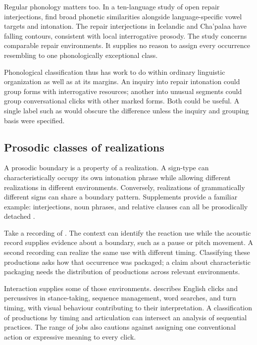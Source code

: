 \documentclass[12pt]{article}
\begin{document}
Regular phonology matters too. In a ten-language study of open repair
interjections, \textcite{dingemanse2013huh} find broad phonetic similarities
alongside language-specific vowel targets and intonation. The repair interjections in Icelandic and
Cha'palaa have falling contours, consistent with local interrogative
prosody. The study concerns comparable repair environments. It supplies
no reason to assign every occurrence resembling  to one
phonologically exceptional class.

Phonological classification thus has work to do within ordinary linguistic
organization as well as at its margins. An inquiry into repair intonation
could group forms with interrogative resources; another into unusual
segments could group conversational clicks with other marked forms.
Both could be useful. A single label such as  would obscure
the difference unless the inquiry and grouping basis were specified.

\subsection{Prosodic classes of realizations}

A prosodic boundary is a property of a realization. A sign-type can
characteristically occupy its own intonation phrase while allowing different
realizations in different environments. Conversely, realizations of
grammatically different signs can share a boundary pattern. Supplements
provide a familiar example: interjections, noun phrases, and relative
clauses can all be prosodically detached
\citep[66, 1350]{HuddlestonPullum2002}.

Take a recording of . The
context can identify the reaction use while the acoustic record supplies
evidence about a boundary, such as a pause or pitch movement. A
second recording can realize the same use with different timing.
Classifying these productions asks how that occurrence was packaged;
a claim about characteristic packaging needs the distribution of
productions across relevant environments.

Interaction supplies some of those environments. \textcite{ogden2013clicks} describes English
clicks and percussives in stance-taking, sequence management, word searches,
and turn timing, with visual behaviour contributing to their interpretation. A classification of productions by timing and
articulation can intersect an analysis of sequential practices.
The range of jobs also cautions against assigning one conventional action
or expressive meaning to every click.
\end{document}
